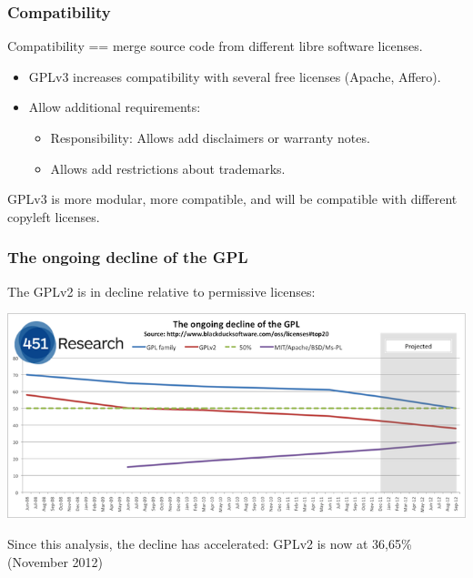 \documentclass{beamer}
\begin{document}

\begin{frame}
\frametitle{Compatibility}

Compatibility == merge source code from different libre software licenses.

\begin{itemize}
\item GPLv3 increases compatibility with several free licenses (Apache, Affero).
\item Allow additional requirements:
\begin{itemize}
\item Responsibility: Allows add disclaimers or warranty notes.
\item Allows add restrictions about trademarks.
\end{itemize}
\end{itemize}

GPLv3 is more modular, more compatible, and will be compatible with different copyleft licenses.

\end{frame}


\begin{frame}
\frametitle{The ongoing decline of the GPL}

\begin{center}
\small
The GPLv2 is in decline relative to permissive licenses:

\medskip

\includegraphics[scale=0.7,clip=true]{figs/gplusage.png}
\end{center}

\begin{center}
\small
Since this analysis, the decline has accelerated: GPLv2 is now at 36,65\% (November 2012)
\end{center}

\end{frame}
\end{document}
